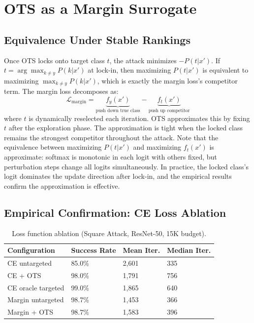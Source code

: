 \documentclass{cap2026}
\begin{document}
\section{OTS as a Margin Surrogate}\label{sec:margin-surrogate}

\subsection{Equivalence Under Stable Rankings}\label{sec:equivalence}

Once OTS locks onto target class $t$, the attack minimizes $-P(t|x')$. If $t = \arg\max_{k \neq y} P(k|x')$ at lock-in, then maximizing $P(t|x')$ is equivalent to maximizing $\max_{k \neq y} P(k|x')$, which is exactly the margin loss's competitor term. The margin loss decomposes as:
\begin{equation}
\mathcal{L}_{\text{margin}} = \underbrace{f_y(x')}_{\text{push down true class}} - \underbrace{f_t(x')}_{\text{push up competitor}}
\end{equation}
where $t$ is dynamically reselected each iteration. OTS approximates this by fixing $t$ after the exploration phase. The approximation is tight when the locked class remains the strongest competitor throughout the attack. Note that the equivalence between maximizing $P(t|x')$ and maximizing $f_t(x')$ is approximate: softmax is monotonic in each logit with others fixed, but perturbation steps change all logits simultaneously. In practice, the locked class's logit dominates the update direction after lock-in, and the empirical results confirm the approximation is effective.

\subsection{Empirical Confirmation: CE Loss Ablation}\label{sec:loss-ablation}

\begin{table}[t]
\centering
\caption{Loss function ablation (Square Attack, ResNet-50, 15K budget).}
\label{tab:loss-ablation}
\small
\begin{tabular}{@{}llll@{}}
\toprule
Configuration & Success Rate & Mean Iter. & Median Iter. \\
\midrule
CE untargeted & 85.0\% & 2,601 & 335 \\
CE + OTS & 98.0\% & 1,791 & 756 \\
CE oracle targeted & 99.0\% & 1,865 & 640 \\
Margin untargeted & 98.7\% & 1,453 & 366 \\
Margin + OTS & 98.7\% & 1,583 & 396 \\
\bottomrule
\end{tabular}
\end{table}
\end{document}
